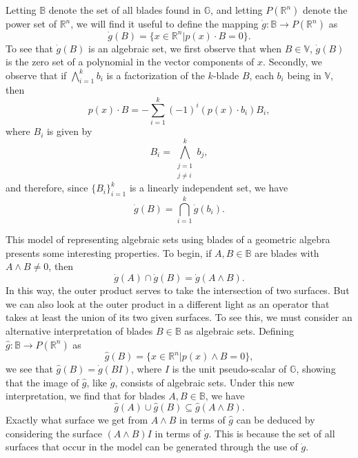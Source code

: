 \documentclass{ecgd-l}
\theoremstyle{definition}
\theoremstyle{remark}
\numberwithin{equation}{section}
\newcommand{\R}{\mathbb{R}}
\newcommand{\B}{\mathbb{B}}
\newcommand{\G}{\mathbb{G}}
\newcommand{\V}{\mathbb{V}}
\newcommand{\gd}{\dot{g}}
\newcommand{\gh}{\hat{g}}
\begin{document}
Letting $\B$ denote the set of all blades found in $\G$,
and letting $P(\R^n)$ denote the power set of $\R^n$,
we will find it useful to define the mapping $\gd:\B\to P(\R^n)$ as
\begin{equation}\label{equ_gd}
\gd(B) = \{x\in\R^n|p(x)\cdot B=0\}.
\end{equation}
To see that $\gd(B)$ is an algebraic set, we first observe that when $B\in\V$,
$\gd(B)$ is the zero set of a polynomial in the vector components of $x$.
Secondly, we observe that if $\bigwedge_{i=1}^k b_i$ is a factorization
of the $k$-blade $B$, each $b_i$ being in $\V$, then
\begin{equation}\label{equ_expand_p_dot_B}
p(x)\cdot B = -\sum_{i=1}^k (-1)^i (p(x)\cdot b_i)B_i,
\end{equation}
where $B_i$ is given by
\begin{equation*}
B_i = \bigwedge_{\substack{j=1\\j\neq i}}^k b_j,
\end{equation*}
and therefore, since $\{B_i\}_{i=1}^k$ is a linearly independent set, we have
\begin{equation*}
\gd(B) = \bigcap_{i=1}^k \gd(b_i).
\end{equation*}

This model of representing algebraic sets using blades of a geometric algebra presents
some interesting properties.  To begin, if $A,B\in\B$ are blades with $A\wedge B\neq 0$,
then
\begin{equation*}
\gd(A)\cap\gd(B)=\gd(A\wedge B).
\end{equation*}
In this way, the outer product serves to take the intersection of two surfaces.  But we can also
look at the outer product in a different light as an operator that takes at least the union
of its two given surfaces.  To see this, we must consider an alternative interpretation
of blades $B\in\B$ as algebraic sets.  Defining $\gh:\B\to P(\R^n)$ as
\begin{equation}\label{equ_gh}
\gh(B)=\{x\in\R^n|p(x)\wedge B=0\},
\end{equation}
we see that $\gh(B)=\gd(BI)$, where $I$ is the unit pseudo-scalar of $\G$, showing
that the image of $\gh$, like $\gd$, consists of algebraic sets.
Under this new interpretation, we find that for blades $A,B\in\B$, we have
\begin{equation*}
\gh(A)\cup\gh(B)\subseteq\gh(A\wedge B).
\end{equation*}
Exactly what surface we get from $A\wedge B$ in terms of $\gh$ can
be deduced by considering the surface $(A\wedge B)I$ in terms of $\gd$.
This is because the set of all surfaces that occur in the model can be generated through the
use of $\gd$.
\end{document}
